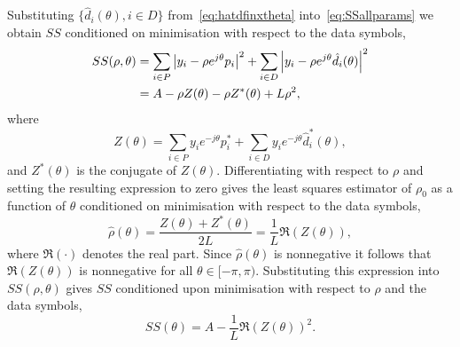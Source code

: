 \documentclass[journal]{IEEEtran}
\begin{document}
Substituting $\{ \hat{d}_i(\theta), i \in D \}$ from~\eqref{eq:hatdfinxtheta} into~\eqref{eq:SSallparams} we obtain $SS$ conditioned on minimisation with respect to the data symbols,
 \begin{align*}
SS(\rho, \theta) &=\sum_{i \in P} {\left\vert  y_i - \rho e^{j\theta} p_i  \right\vert}^2 + \sum_{i \in D} {\left\vert  y_i - \rho e^{j\theta} \hat{d_i}(\theta)  \right\vert}^2 \\
&= A - \rho Z(\theta) - \rho Z^*(\theta) + L \rho^2,
\end{align*}
where
\[
Z(\theta)  = \sum_{i \in P} y_i e^{-j\theta} p_i^* + \sum_{i \in D} y_i e^{-j\theta} \hat{d}_i^*(\theta),
\]
and $Z^*(\theta)$ is the conjugate of $Z(\theta)$.  Differentiating with respect to $\rho$ and setting the resulting expression to zero gives the least squares estimator of $\rho_0$ as a function of $\theta$ conditioned on minimisation with respect to the data symbols, 
\begin{equation}\label{eq:hatrhoZ}
\hat{\rho}(\theta) = \frac{Z(\theta) + Z^*(\theta)}{2L} = \frac{1}{L}\Re(Z(\theta)),
\end{equation}
where $\Re(\cdot)$ denotes the real part.  Since $\hat{\rho}(\theta)$ is nonnegative it follows that $\Re(Z(\theta))$ is nonnegative for all $\theta \in [-\pi, \pi)$.  Substituting this expression into $SS(\rho, \theta)$ gives $SS$ conditioned upon minimisation with respect to $\rho$ and the data symbols,
\[
SS(\theta) = A - \frac{1}{L}\Re(Z(\theta))^2.
\]
\end{document}
